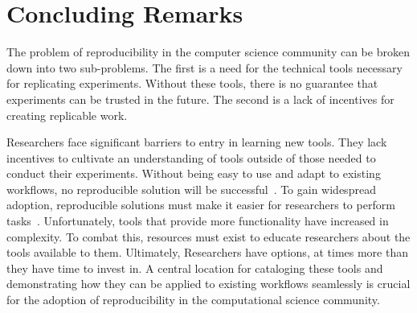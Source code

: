 \documentclass{IEEEtran}
\begin{document}
\section{Concluding Remarks}
The problem of reproducibility in the computer science community can be broken down into two sub-problems. The first is a need for the technical tools necessary for replicating experiments. Without these tools, there is no guarantee that experiments can be trusted in the future. The second is a lack of incentives for creating replicable work.

Researchers face significant barriers to entry in learning new tools. They lack incentives to cultivate an understanding of tools outside of those needed to conduct their experiments. Without being easy to use and adapt to existing workflows, no reproducible solution will be successful~\cite{ITD}. To gain widespread adoption, reproducible solutions must make it easier for researchers to perform tasks~\cite{ITD}. Unfortunately, tools that provide more functionality have increased in complexity. To combat this, resources must exist to educate researchers about the tools available to them. Ultimately, Researchers have options, at times more than they have time to invest in. A central location for cataloging these tools and demonstrating how they can be applied to existing workflows seamlessly is crucial for the adoption of reproducibility in the computational science community.


\end{document}
